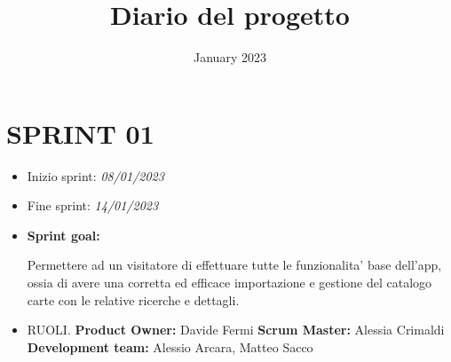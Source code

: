 \documentclass{article}
\title{Diario del progetto}
\date{January 2023}
\begin{document}
    \maketitle

    \section{SPRINT 01}

    \begin{itemize}
        \item Inizio sprint: \textit{08/01/2023}
        \item Fine sprint: \textit{14/01/2023}
    \end{itemize}

    \begin{itemize}
        \item \textbf{Sprint goal:}
        \begin{indent}
            \newline Permettere ad un visitatore di effettuare tutte le funzionalita' base dell'app, ossia di avere una corretta ed efficace importazione e gestione del catalogo carte con le relative ricerche e dettagli.
        \end{indent}
    \end{itemize}

    \begin{itemize}
        \item RUOLI.
        \newline \textbf{Product Owner:} Davide Fermi
        \newline \textbf{Scrum Master:} Alessia Crimaldi
        \newline \textbf{Development team:} Alessio Arcara, Matteo Sacco
    \end{itemize}
\end{document}
